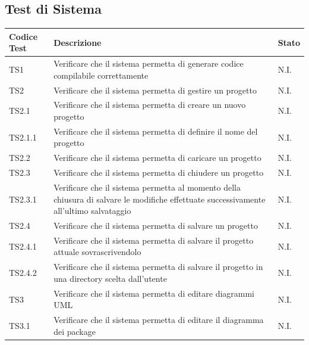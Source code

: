 \documentclass[../PianoDiQualifica.tex]{subfiles}
\begin{document}
\subsection{Test di Sistema}
\begin{longtabu} to \textwidth {
		X[2,l,p]
		X[8,l,p]
		X[1,l,p]}
	\toprule
	 Codice Test & Descrizione & Stato \\
	\midrule
	\endhead
	\midrule
	\addlinespace[0.2em]
	TS1 & Verificare che il sistema permetta di generare codice compilabile correttamente & N.I. \\
	\addlinespace[0.2em]
	\midrule
	\addlinespace[0.2em]
	TS2 & Verificare che il sistema permetta di gestire un progetto & N.I. \\
	\addlinespace[0.2em]
	\midrule
	\addlinespace[0.2em]
	TS2.1 & Verificare che il sistema permetta di creare un nuovo progetto & N.I. \\
	\addlinespace[0.2em]
	\midrule
	\addlinespace[0.2em]
	TS2.1.1 & Verificare che il sistema permetta di definire il nome del progetto & N.I. \\
	\addlinespace[0.2em]
	\midrule
	\addlinespace[0.2em]
	TS2.2 & Verificare che il sistema permetta di caricare un progetto & N.I. \\
	\addlinespace[0.2em]
	\midrule
	\addlinespace[0.2em]
	TS2.3 & Verificare che il sistema permetta di chiudere un progetto & N.I. \\
	\addlinespace[0.2em]
	\midrule
	\addlinespace[0.2em]
	TS2.3.1 & Verificare che il sistema permetta al momento della chiusura di salvare le modifiche effettuate successivamente all'ultimo salvataggio & N.I. \\
	\addlinespace[0.2em]
	\midrule
	\addlinespace[0.2em]
	TS2.4 & Verificare che il sistema permetta di salvare un progetto & N.I. \\
	\addlinespace[0.2em]
	\midrule
	\addlinespace[0.2em]
	TS2.4.1 & Verificare che il sistema permetta di salvare il progetto attuale sovrascrivendolo & N.I. \\
	\addlinespace[0.2em]
	\midrule
	\addlinespace[0.2em]
	TS2.4.2 & Verificare che il sistema permetta di salvare il progetto in una directory scelta dall'utente & N.I. \\
	\addlinespace[0.2em]
	\midrule
	\addlinespace[0.2em]
	TS3 & Verificare che il sistema permetta di editare diagrammi UML & N.I. \\
	\addlinespace[0.2em]
	\midrule
	\addlinespace[0.2em]
	TS3.1 & Verificare che il sistema permetta di editare il diagramma dei package & N.I. \\

\end{longtabu}
\end{document}
